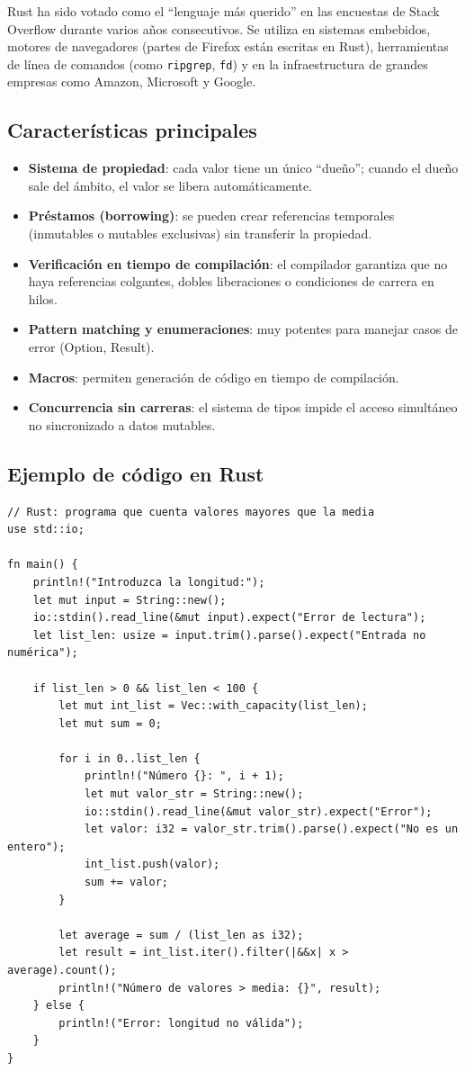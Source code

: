 Rust ha sido votado como el ``lenguaje más querido'' en las encuestas de Stack Overflow durante varios años consecutivos. Se utiliza en sistemas embebidos, motores de navegadores (partes de Firefox están escritas en Rust), herramientas de línea de comandos (como \texttt{ripgrep}, \texttt{fd}) y en la infraestructura de grandes empresas como Amazon, Microsoft y Google.

\subsection{Características principales}

\begin{itemize}
  \item \textbf{Sistema de propiedad}: cada valor tiene un único ``dueño''; cuando el dueño sale del ámbito, el valor se libera automáticamente.
  \item \textbf{Préstamos (borrowing)}: se pueden crear referencias temporales (inmutables o mutables exclusivas) sin transferir la propiedad.
  \item \textbf{Verificación en tiempo de compilación}: el compilador garantiza que no haya referencias colgantes, dobles liberaciones o condiciones de carrera en hilos.
  \item \textbf{Pattern matching y enumeraciones}: muy potentes para manejar casos de error (Option, Result).
  \item \textbf{Macros}: permiten generación de código en tiempo de compilación.
  \item \textbf{Concurrencia sin carreras}: el sistema de tipos impide el acceso simultáneo no sincronizado a datos mutables.
\end{itemize}

\subsection{Ejemplo de código en Rust}

\begin{verbatim}
// Rust: programa que cuenta valores mayores que la media
use std::io;

fn main() {
    println!("Introduzca la longitud:");
    let mut input = String::new();
    io::stdin().read_line(&mut input).expect("Error de lectura");
    let list_len: usize = input.trim().parse().expect("Entrada no numérica");

    if list_len > 0 && list_len < 100 {
        let mut int_list = Vec::with_capacity(list_len);
        let mut sum = 0;

        for i in 0..list_len {
            println!("Número {}: ", i + 1);
            let mut valor_str = String::new();
            io::stdin().read_line(&mut valor_str).expect("Error");
            let valor: i32 = valor_str.trim().parse().expect("No es un entero");
            int_list.push(valor);
            sum += valor;
        }

        let average = sum / (list_len as i32);
        let result = int_list.iter().filter(|&&x| x > average).count();
        println!("Número de valores > media: {}", result);
    } else {
        println!("Error: longitud no válida");
    }
}
\end{verbatim}

